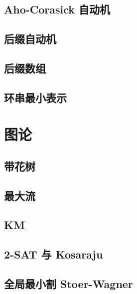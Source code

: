 \documentclass[10pt, a4paper]{article}
\begin{document}
		\subsection{Aho-Corasick 自动机}
		

	\subsection{后缀自动机}
		

	\subsection{后缀数组}
		
	
	\subsection{环串最小表示}
		

\section{图论}
	\subsection{带花树}
		

	\subsection{最大流}
		
	
	\subsection{KM}
		

	\subsection{2-SAT 与 Kosaraju}
		

	\subsection{全局最小割 Stoer-Wagner}
		
\end{document}
